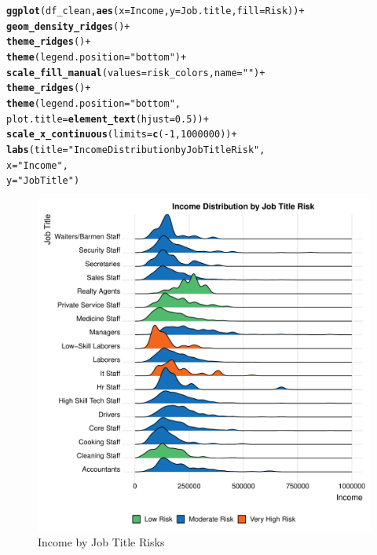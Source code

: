 \documentclass{article}\usepackage[]{graphicx}\usepackage[]{xcolor}
\makeatletter
\def\maxwidth{ %
  \ifdim\Gin@nat@width>\linewidth
    \linewidth
  \else
    \Gin@nat@width
  \fi
}
\newcommand{\hlnum}[1]{\textcolor[rgb]{0.686,0.059,0.569}{#1}}%
\newcommand{\hlsng}[1]{\textcolor[rgb]{0.192,0.494,0.8}{#1}}%
\newcommand{\hlopt}[1]{\textcolor[rgb]{0,0,0}{#1}}%
\newcommand{\hldef}[1]{\textcolor[rgb]{0.345,0.345,0.345}{#1}}%
\newcommand{\hlkwc}[1]{\textcolor[rgb]{0.333,0.667,0.333}{#1}}%
\newcommand{\hlkwd}[1]{\textcolor[rgb]{0.737,0.353,0.396}{\textbf{#1}}}%
\newenvironment{kframe}{%
 \def\at@end@of@kframe{}%
 \ifinner\ifhmode%
  \def\at@end@of@kframe{\end{minipage}}%
  \begin{minipage}{\columnwidth}%
 \fi\fi%
 \def\FrameCommand##1{\hskip\@totalleftmargin \hskip-\fboxsep
 \colorbox{shadecolor}{##1}\hskip-\fboxsep
     \hskip-\linewidth \hskip-\@totalleftmargin \hskip\columnwidth}%
 \MakeFramed {\advance\hsize-\width
   \@totalleftmargin\z@ \linewidth\hsize
   \@setminipage}}%
 {\par\unskip\endMakeFramed%
 \at@end@of@kframe}
\newenvironment{knitrout}{}{} %
\makeatother
\begin{document}
\begin{knitrout}
\begin{kframe}
\begin{alltt}
\hlkwd{ggplot}\hldef{(df_clean,} \hlkwd{aes}\hldef{(}\hlkwc{x} \hldef{= Income,} \hlkwc{y} \hldef{= Job.title,} \hlkwc{fill} \hldef{= Risk))} \hlopt{+}
  \hlkwd{geom_density_ridges}\hldef{()} \hlopt{+}
  \hlkwd{theme_ridges}\hldef{()} \hlopt{+}
  \hlkwd{theme}\hldef{(}\hlkwc{legend.position} \hldef{=} \hlsng{"bottom"}\hldef{)} \hlopt{+}
  \hlkwd{scale_fill_manual}\hldef{(}\hlkwc{values} \hldef{= risk_colors,} \hlkwc{name} \hldef{=} \hlsng{""}\hldef{)} \hlopt{+}
  \hlkwd{theme_ridges}\hldef{()} \hlopt{+}
  \hlkwd{theme}\hldef{(}\hlkwc{legend.position} \hldef{=} \hlsng{"bottom"}\hldef{,}
        \hlkwc{plot.title} \hldef{=} \hlkwd{element_text}\hldef{(}\hlkwc{hjust} \hldef{=} \hlnum{0.5}\hldef{))} \hlopt{+}
  \hlkwd{scale_x_continuous}\hldef{(}\hlkwc{limits} \hldef{=} \hlkwd{c}\hldef{(}\hlopt{-}\hlnum{1}\hldef{,} \hlnum{1000000}\hldef{))} \hlopt{+}
  \hlkwd{labs}\hldef{(}\hlkwc{title} \hldef{=} \hlsng{"Income Distribution by Job Title Risk"}\hldef{,}
       \hlkwc{x} \hldef{=} \hlsng{"Income"}\hldef{,}
       \hlkwc{y} \hldef{=} \hlsng{"Job Title"}\hldef{)}
\end{alltt}
\end{kframe}\begin{figure}[H]
\includegraphics[width=\maxwidth]{figure/unnamed-chunk-45-1} \caption[Income by Job Title Risks]{Income by Job Title Risks}\label{fig:unnamed-chunk-45}
\end{figure}

\end{knitrout}
\end{document}
